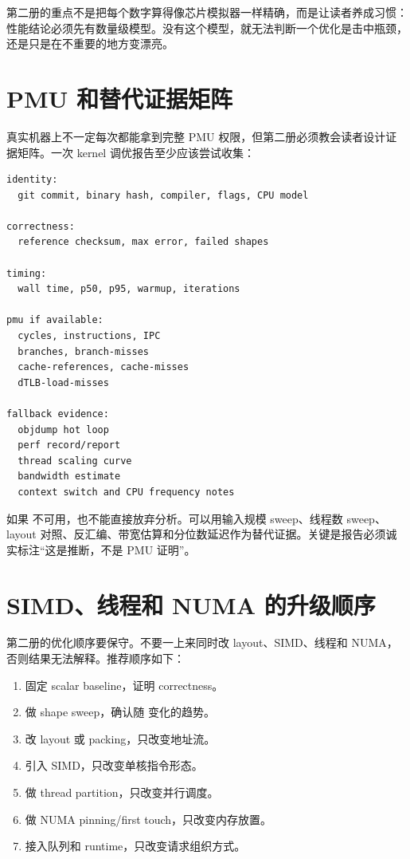 第二册的重点不是把每个数字算得像芯片模拟器一样精确，而是让读者养成习惯：性能结论必须先有数量级模型。没有这个模型，就无法判断一个优化是击中瓶颈，还是只是在不重要的地方变漂亮。

\section*{PMU 和替代证据矩阵}

真实机器上不一定每次都能拿到完整 PMU 权限，但第二册必须教会读者设计证据矩阵。一次 kernel 调优报告至少应该尝试收集：

\begin{lstlisting}[numbers=none,caption={第二册 kernel 证据矩阵}]
identity:
  git commit, binary hash, compiler, flags, CPU model

correctness:
  reference checksum, max error, failed shapes

timing:
  wall time, p50, p95, warmup, iterations

pmu if available:
  cycles, instructions, IPC
  branches, branch-misses
  cache-references, cache-misses
  dTLB-load-misses

fallback evidence:
  objdump hot loop
  perf record/report
  thread scaling curve
  bandwidth estimate
  context switch and CPU frequency notes
\end{lstlisting}

如果  不可用，也不能直接放弃分析。可以用输入规模 sweep、线程数 sweep、layout 对照、反汇编、带宽估算和分位数延迟作为替代证据。关键是报告必须诚实标注“这是推断，不是 PMU 证明”。

\section*{SIMD、线程和 NUMA 的升级顺序}

第二册的优化顺序要保守。不要一上来同时改 layout、SIMD、线程和 NUMA，否则结果无法解释。推荐顺序如下：

\begin{enumerate}
  \item 固定 scalar baseline，证明 correctness。
  \item 做 shape sweep，确认随  变化的趋势。
  \item 改 layout 或 packing，只改变地址流。
  \item 引入 SIMD，只改变单核指令形态。
  \item 做 thread partition，只改变并行调度。
  \item 做 NUMA pinning/first touch，只改变内存放置。
  \item 接入队列和 runtime，只改变请求组织方式。
\end{enumerate}

